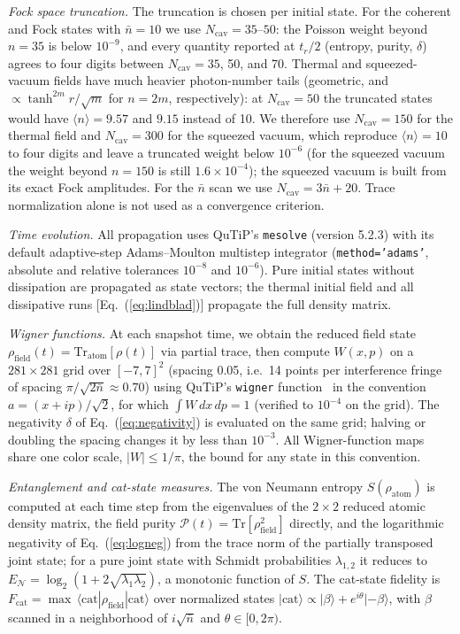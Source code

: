 \documentclass{iopjournal}
\begin{document}
\textit{Fock space truncation.} The truncation is chosen per initial state. For the coherent and Fock states with $\bar{n} = 10$ we use $N_{\text{cav}} = 35$--$50$: the Poisson weight beyond $n = 35$ is below $10^{-9}$, and every quantity reported at $t_r/2$ (entropy, purity, $\delta$) agrees to four digits between $N_{\text{cav}} = 35$, 50, and 70. Thermal and squeezed-vacuum fields have much heavier photon-number tails (geometric, and $\propto \tanh^{2m}r/\sqrt{m}$ for $n = 2m$, respectively): at $N_{\text{cav}} = 50$ the truncated states would have $\langle n\rangle = 9.57$ and $9.15$ instead of 10. We therefore use $N_{\text{cav}} = 150$ for the thermal field and $N_{\text{cav}} = 300$ for the squeezed vacuum, which reproduce $\langle n\rangle = 10$ to four digits and leave a truncated weight below $10^{-6}$ (for the squeezed vacuum the weight beyond $n = 150$ is still $1.6\times10^{-4}$); the squeezed vacuum is built from its exact Fock amplitudes. For the $\bar{n}$ scan we use $N_{\text{cav}} = 3\bar{n} + 20$. Trace normalization alone is not used as a convergence criterion.

\textit{Time evolution.} All propagation uses QuTiP's \texttt{mesolve} (version 5.2.3) with its default adaptive-step Adams--Moulton multistep integrator (\texttt{method='adams'}, absolute and relative tolerances $10^{-8}$ and $10^{-6}$). Pure initial states without dissipation are propagated as state vectors; the thermal initial field and all dissipative runs [Eq.~(\ref{eq:lindblad})] propagate the full density matrix.

\textit{Wigner functions.} At each snapshot time, we obtain the reduced field state $\rho_{\text{field}}(t) = \text{Tr}_{\text{atom}}[\rho(t)]$ via partial trace, then compute $W(x,p)$ on a $281 \times 281$ grid over $[-7, 7]^2$ (spacing 0.05, i.e.\ 14 points per interference fringe of spacing $\pi/\sqrt{2\bar{n}} \approx 0.70$) using QuTiP's \texttt{wigner} function~\cite{johansson2012} in the convention $a = (x + ip)/\sqrt{2}$, for which $\int W\,dx\,dp = 1$ (verified to $10^{-4}$ on the grid). The negativity $\delta$ of Eq.~(\ref{eq:negativity}) is evaluated on the same grid; halving or doubling the spacing changes it by less than $10^{-3}$. All Wigner-function maps share one color scale, $|W| \leq 1/\pi$, the bound for any state in this convention.

\textit{Entanglement and cat-state measures.} The von Neumann entropy $S(\rho_{\text{atom}})$ is computed at each time step from the eigenvalues of the $2 \times 2$ reduced atomic density matrix, the field purity $\mathcal{P}(t) = \text{Tr}[\rho_{\text{field}}^2]$ directly, and the logarithmic negativity of Eq.~(\ref{eq:logneg}) from the trace norm of the partially transposed joint state; for a pure joint state with Schmidt probabilities $\lambda_{1,2}$ it reduces to $E_{\mathcal{N}} = \log_2(1 + 2\sqrt{\lambda_1\lambda_2})$, a monotonic function of $S$. The cat-state fidelity is $F_{\text{cat}} = \max\,\langle \text{cat}|\rho_{\text{field}}|\text{cat}\rangle$ over normalized states $|\text{cat}\rangle \propto |\beta\rangle + e^{i\theta}|{-\beta}\rangle$, with $\beta$ scanned in a neighborhood of $i\sqrt{\bar{n}}$ and $\theta \in [0, 2\pi)$.
\end{document}
